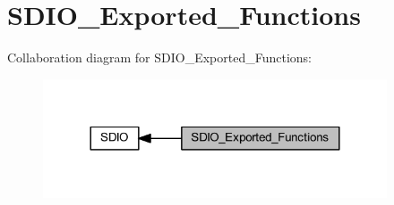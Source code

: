 \hypertarget{group___s_d_i_o___exported___functions}{}\section{S\+D\+I\+O\+\_\+\+Exported\+\_\+\+Functions}
\label{group___s_d_i_o___exported___functions}
Collaboration diagram for S\+D\+I\+O\+\_\+\+Exported\+\_\+\+Functions\+:
\nopagebreak
\begin{figure}[H]
\begin{center}
\leavevmode
\includegraphics[width=288pt]{group___s_d_i_o___exported___functions}
\end{center}
\end{figure}
